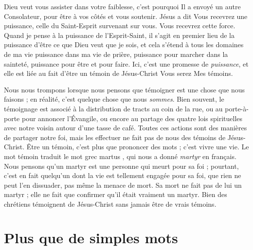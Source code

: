 Dieu veut vous assister dans votre faiblesse,
 c'est pourquoi Il a envoyé un autre Consolateur,
 pour être à vos côtés et vous soutenir. Jésus a dit\frcolon{}
 \Og Vous recevrez une puissance,
 celle du Saint-Esprit survenant sur vous. \Fg{}
 Vous recevrez cette force. Quand je pense à la puissance
 de l'Esprit-Saint, il s'agit en premier lieu de
 la puissance d'être ce que Dieu
 veut que je sois, et cela s'étend à tous les domaines de ma vie\frcolon{}
 puissance dans ma vie de prière, puissance pour marcher
 dans la sainteté, puissance pour être et pour faire.
 Ici, c'est une promesse de \emph{puissance}, et elle est liée au fait
 d'être un témoin de Jésus-Christ\frcolon{} \Og Vous serez Mes témoins. \Fg{}

Nous nous trompons lorsque nous pensons que témoigner
 est une chose que nous faisons ;
 en réalité, c'est quelque chose que nous \emph{som\-mes}.
 Bien souvent, le témoignage est associé à la distribution de tracts
 au coin de la rue, ou au porte-à-porte pour annoncer l'Évangile,
 ou encore au partage des quatre lois spirituelles avec notre voisin
 autour d'une tasse de café.
 Toutes ces actions sont des manières de partager notre foi,
 mais les effectuer ne fait pas de nous des témoins de Jésus-Christ.
 Être un témoin, c'est plus que prononcer des mots ; c'est vivre une vie.
 Le mot \Og témoin \Fg{} traduit le mot grec \Og martus \Fg{},
 qui nous a donné \emph{martyr} en français.
 Nous pensons qu'un martyr est une personne qui meurt pour sa foi ;
 pourtant, c'est en fait quelqu'un dont la vie est tellement engagée
 pour sa foi, que rien ne peut l'en dissuader, pas même la menace de mort.
 Sa mort ne fait pas de lui un martyr ; elle ne fait que confirmer
 qu'il était vraiment un martyr.
 Bien des chrétiens témoignent de Jésus-Christ
 sans jamais être de vrais témoins.

\section{Plus que de simples mots}

